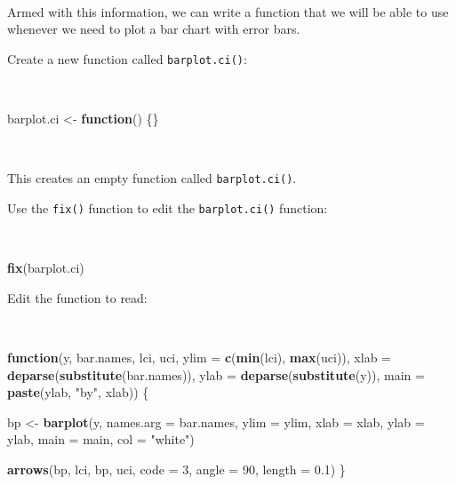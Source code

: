 \documentclass[12pt,a4paper]{book}
\newenvironment{Shaded}{\begin{snugshade}}{\end{snugshade}}
\newcommand{\KeywordTok}[1]{\textcolor[rgb]{0.13,0.29,0.53}{\textbf{#1}}}
\newcommand{\DataTypeTok}[1]{\textcolor[rgb]{0.13,0.29,0.53}{#1}}
\newcommand{\DecValTok}[1]{\textcolor[rgb]{0.00,0.00,0.81}{#1}}
\newcommand{\FloatTok}[1]{\textcolor[rgb]{0.00,0.00,0.81}{#1}}
\newcommand{\StringTok}[1]{\textcolor[rgb]{0.31,0.60,0.02}{#1}}
\newcommand{\ControlFlowTok}[1]{\textcolor[rgb]{0.13,0.29,0.53}{\textbf{#1}}}
\newcommand{\NormalTok}[1]{#1}
\theoremstyle{definition}
\theoremstyle{definition}
\theoremstyle{definition}
\theoremstyle{remark}
\begin{document}
~

Armed with this information, we can write a function that we will be
able to use whenever we need to plot a bar chart with error bars.

Create a new function called \texttt{barplot.ci()}:

~

\begin{Shaded}
\begin{Highlighting}[]
\NormalTok{barplot.ci <-}\StringTok{ }\ControlFlowTok{function}\NormalTok{() \{\}}
\end{Highlighting}
\end{Shaded}

~

This creates an empty function called \texttt{barplot.ci()}.

Use the \texttt{fix()} function to edit the \texttt{barplot.ci()}
function:

~

\begin{Shaded}
\begin{Highlighting}[]
\KeywordTok{fix}\NormalTok{(barplot.ci)}
\end{Highlighting}
\end{Shaded}

\newpage

Edit the function to read:

~

\begin{Shaded}
\begin{Highlighting}[]
\ControlFlowTok{function}\NormalTok{(y, bar.names, lci, uci,}
         \DataTypeTok{ylim =} \KeywordTok{c}\NormalTok{(}\KeywordTok{min}\NormalTok{(lci), }\KeywordTok{max}\NormalTok{(uci)),}
         \DataTypeTok{xlab =} \KeywordTok{deparse}\NormalTok{(}\KeywordTok{substitute}\NormalTok{(bar.names)),}
         \DataTypeTok{ylab =} \KeywordTok{deparse}\NormalTok{(}\KeywordTok{substitute}\NormalTok{(y)),}
         \DataTypeTok{main =} \KeywordTok{paste}\NormalTok{(ylab, }\StringTok{"by"}\NormalTok{, xlab)) \{}
     
\NormalTok{  bp <-}\StringTok{ }\KeywordTok{barplot}\NormalTok{(y, }\DataTypeTok{names.arg =}\NormalTok{ bar.names, }\DataTypeTok{ylim =}\NormalTok{ ylim, }\DataTypeTok{xlab =}\NormalTok{ xlab,}
                \DataTypeTok{ylab =}\NormalTok{ ylab, }\DataTypeTok{main =}\NormalTok{ main, }\DataTypeTok{col =} \StringTok{"white"}\NormalTok{)}
     
  \KeywordTok{arrows}\NormalTok{(bp, lci, bp, uci, }\DataTypeTok{code =} \DecValTok{3}\NormalTok{, }\DataTypeTok{angle =} \DecValTok{90}\NormalTok{, }\DataTypeTok{length =} \FloatTok{0.1}\NormalTok{)}
\NormalTok{\}}
\end{Highlighting}
\end{Shaded}
\end{document}

